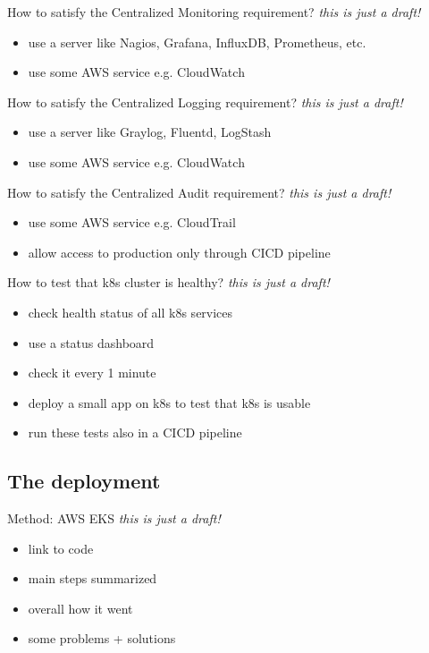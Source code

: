 \documentclass{beamer}
\begin{document}
\begin{frame}{How to satisfy the Centralized Monitoring requirement?}%
\textit{this is just a draft!}
\begin{itemize}
	\item use a server like Nagios, Grafana, InfluxDB, Prometheus, etc.
	\item use some AWS service e.g. CloudWatch
\end{itemize}
\end{frame}

\begin{frame}{How to satisfy the Centralized Logging requirement?}%
\textit{this is just a draft!}
\begin{itemize}
	\item use a server like Graylog, Fluentd, LogStash
	\item use some AWS service e.g. CloudWatch
\end{itemize}
\end{frame}

\begin{frame}{How to satisfy the Centralized Audit requirement?}%
\textit{this is just a draft!}
\begin{itemize}
	\item use some AWS service e.g. CloudTrail
	\item allow access to production only through CICD pipeline
\end{itemize}
\end{frame}

\begin{frame}{How to test that k8s cluster is healthy?}%
\textit{this is just a draft!}
\begin{itemize}
	\item check health status of all k8s services
	\item use a status dashboard
	\item check it every 1 minute
	\item deploy a small app on k8s to test that k8s is usable
	\item run these tests also in a CICD pipeline
\end{itemize}
\end{frame}

\subsection{The deployment}
\begin{frame}{Method: AWS EKS}%
\textit{this is just a draft!}
\begin{itemize}
	\item link to code
	\item main steps summarized
	\item overall how it went
	\item some problems + solutions 
\end{itemize}
\end{frame}
\end{document}
